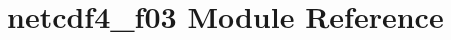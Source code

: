 \hypertarget{namespacenetcdf4__f03}{}\section{netcdf4\+\_\+f03 Module Reference}
\label{namespacenetcdf4__f03}
